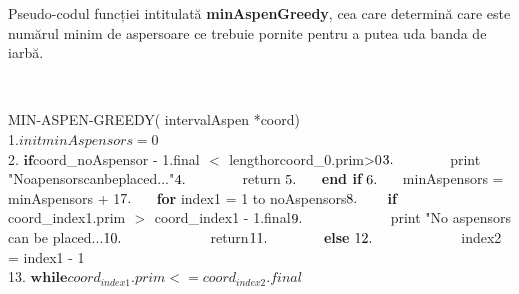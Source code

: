 \documentclass{article}
\begin{document}
\begin{algorithm}
\vspace{6mm}
\caption{Pseudo-codul funcției intitulată \textbf{minAspenGreedy}, cea care determină care este numărul minim de aspersoare ce trebuie pornite pentru a putea uda banda de iarbă.} \vspace{6mm}
\\
\begin{algorithm}
\begin{algorithmic}[2]
MIN-ASPEN-GREEDY( intervalAspen *coord) \\
1.\indent   \>$init minAspensors = 0$ \\
2. \indent            \> $\textbf{if} $coord_{noAspensor - 1}.final $ $ < $ $ length$ $or$ $coord_{0}.prim$ $>$ $0$ \\
3. \indent            \> \hspace{8mm} $print \hspace{1mm}"No\hspace{1mm}apensors\hspace{1mm}can\hspace{1mm}be\hspace{1mm}placed..."$ \\
4. \indent            \> \hspace{8mm}$return $ \\
5.\indent             \>  $\textbf{end if }$\\
6. \indent            \>  $minAspensors = minAspensors + 1$ \\
7.\indent             \> $\textbf{for} index1 = 1\hspace{2mm} to\hspace{2mm} noAspensors$\\
8. \indent            \>$ \hspace{8mm} \textbf{if} coord_{index1}.prim $ $ > $ $ coord_{index1 - 1}.final$ \\
9.\indent \>\hspace{16mm}$print "No aspensors can be placed...$\\
10.\indent      \>\hspace{16mm}$return$\\
11.\indent  \>\hspace{8mm}$\textbf{else} $\\
12.\indent      \> \hspace{16mm}$index2 = index1 - 1\\  
13.\indent            \>\hspace{20mm} $\textbf{while} coord_{index1}.prim <= coord_{index2}.final $  \\

\end{algorithmic}
\end{algorithm}
\end{algorithm}
\end{document}
